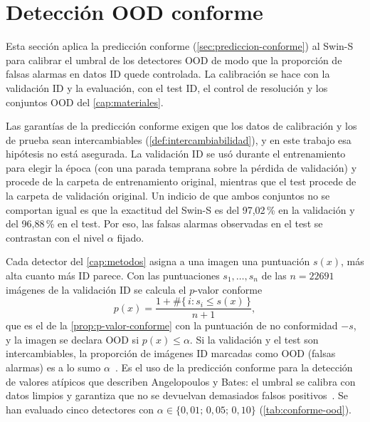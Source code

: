 
\section{Detección OOD conforme}\label{sec:conforme-ood}


Esta sección aplica la predicción conforme (\cref{sec:prediccion-conforme}) al
Swin-S para calibrar el umbral de los detectores OOD de
modo que la proporción de falsas alarmas en datos ID quede controlada. La calibración se hace con la validación ID y la evaluación,
con el test ID, el control de resolución y los conjuntos OOD del
\cref{cap:materiales}.

Las garantías de la predicción conforme exigen que los datos de calibración y los
de prueba sean intercambiables (\cref{def:intercambiabilidad}), y en este trabajo
esa hipótesis no está asegurada. La validación ID se usó durante el entrenamiento
para elegir la época (con una parada temprana sobre la pérdida de validación) y
procede de la carpeta de entrenamiento original, mientras que el test procede de
la carpeta de validación original. Un indicio de que ambos conjuntos no se
comportan igual es que la exactitud del Swin-S es del 97,02\,\% en la validación y
del 96,88\,\% en el test. Por eso, las falsas alarmas observadas en el test se
contrastan con el nivel $\alpha$ fijado.


Cada detector del \cref{cap:metodos} asigna a una imagen una puntuación $s(x)$, más
alta cuanto más ID parece. Con las puntuaciones $s_1,\dots,s_n$ de las
$n = \num{22691}$ imágenes de la validación ID se calcula el $p$-valor conforme
\[
  p(x) = \frac{1 + \#\{\, i : s_i \le s(x) \,\}}{n+1},
\]
que es el de la \cref{prop:p-valor-conforme} con la puntuación de no conformidad
$-s$, y la imagen se declara OOD si $p(x) \le \alpha$. Si la validación y el test
son intercambiables, la proporción de imágenes ID marcadas como OOD (falsas
alarmas) es a lo sumo $\alpha$~\cite{angelopoulos2021,vovk2022}. Es el uso de la
predicción conforme para la detección de valores atípicos que describen
Angelopoulos y Bates: el umbral se calibra con datos limpios y garantiza que no se
devuelvan demasiados falsos positivos~\cite{angelopoulos2021}. Se han evaluado
cinco detectores con $\alpha \in \{0{,}01;\, 0{,}05;\, 0{,}10\}$
(\cref{tab:conforme-ood}).

